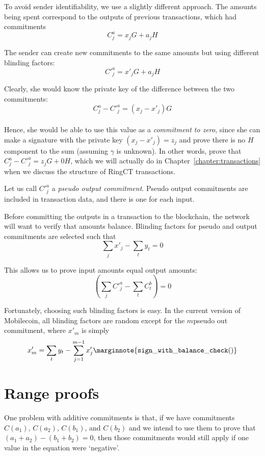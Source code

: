 To avoid sender identifiability, we use a slightly different approach. The amounts being spent correspond to the outputs of previous transactions, which had commitments\vspace{.175cm}
\[C^a_{j} = x_j G + a_j H\]

The sender can create new commitments to the same amounts but using different blinding factors:\vspace{.175cm}
\[C'^a_{j} = x'_j G + a_j H\]

Clearly, she would know the private key of the difference between the two commitments: \vspace{.175cm}
\[C^a_{j} - C'^a_{j} = (x_j - x'_j) G\]\\
Hence, she would be able to use this value as a {\em commitment to zero}, since she can make a signature with the private key $(x_j - x'_j) = z_j$ and prove there is no $H$ component to the sum (assuming $\gamma$ is unknown). In other words, prove that $C^a_{j} - C'^a_{j} = z_j G + 0H$, which we will actually do in Chapter~\ref{chapter:transactions} when we discuss the structure of RingCT transactions.

Let us call $C'^a_j$ a {\em pseudo output commitment}. Pseudo output commitments are included in transaction data, and there is one for each input.

Before committing the outputs in a transaction to the blockchain, the network will want to verify that amounts balance. Blinding factors for pseudo and output commitments are selected such that\vspace{.175cm}
\[\sum_j x'_j  - \sum_t y_t = 0\]

This allows us to prove input amounts equal output amounts:\vspace{.175cm}
\[(\sum_j C'^a_{j} - \sum_t C^b_{t}) = 0\]

Fortunately, choosing such blinding factors is easy. In the current version of Mobilecoin, all blinding factors are random except for the $m$\nth pseudo out commitment, where $x'_m$ is simply
\[x'_m = \sum_t y_t - \sum_{j=1}^{m-1} x'_j\marginnote{{\tt sign\_with\_ balance\_ check()}}\]



\section{Range proofs}
\label{sec:range_proofs}

One problem with additive commitments is that, if we have commitments $C(a_1)$, $C(a_2)$, $C(b_1)$, and $C(b_2)$ and we intend to use them to prove that $(a_1 + a_2) - (b_1 + b_2) = 0$, then those commitments would still apply if one value in the equation were `negative'.

